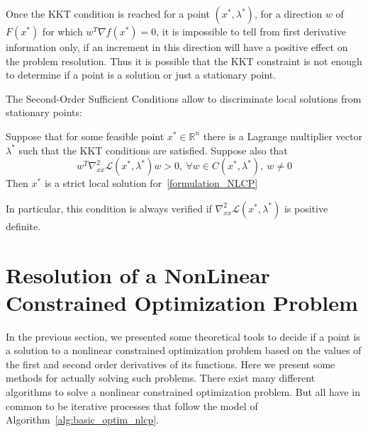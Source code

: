 
Once the KKT condition is reached for a point $(x^*, \lambda^*)$, for a direction $w$ of $F(x^*)$ for which $w^T\nabla f(x^*)=0$, it is impossible to tell from first derivative information only, if an increment in this direction will have a positive effect on the problem resolution.
Thus it is possible that the KKT constraint is not enough to determine if a point is a solution or just a stationary point.

The Second-Order Sufficient Conditions allow to discriminate local solutions from stationary points:

\begin{theorem}
  Suppose that for some feasible point $x^*\in \mathbb{R}^n$ there is a Lagrange multiplier vector $\lambda^*$ such that the KKT conditions are satisfied. Suppose also that
  \begin{equation}
    w^T\nabla_{xx}^2\mathcal{L}(x^*,\lambda^*)w>0,\ \forall w\in C(x^*,\lambda^*),\ w\neq 0
  \end{equation}
  Then $x^*$ is a strict local solution for~\ref{formulation_NLCP}
\end{theorem}

In particular, this condition is always verified if $\nabla_{xx}^2\mathcal{L}(x^*,\lambda^*)$ is positive definite.

\section{Resolution of a NonLinear Constrained Optimization Problem}
\label{sec:resolution_of_a_non_linear_constrained_optimization_problem}

In the previous section, we presented some theoretical tools to decide if a point is a solution to a nonlinear constrained optimization problem based on the values of the first and second order derivatives of its functions.
Here we present some methods for actually solving such problems.
There exist many different algorithms to solve a nonlinear constrained optimization problem.
But all have in common to be iterative processes that follow the model of Algorithm~\ref{alg:basic_optim_nlcp}.

